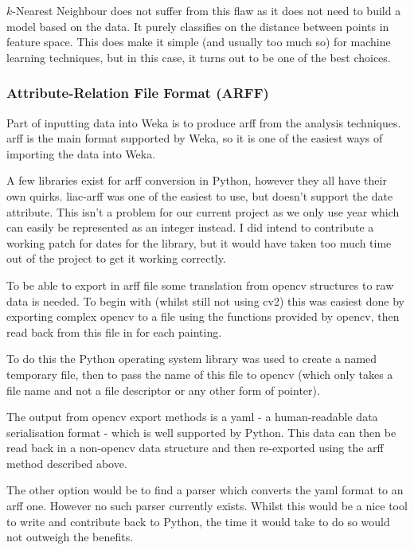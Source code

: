 $k$-Nearest Neighbour does not suffer from this flaw as it does not need to build a model based on
the data. It purely classifies on the distance between points in feature space. This does make it
simple (and usually too much so) for machine learning techniques, but in this case, it turns out to 
be one of the best choices.


\subsubsection{Attribute-Relation File Format (ARFF)}
Part of inputting data into Weka is to produce \gls{arff} from the
analysis techniques. \gls{arff} is the main format supported by Weka, so it is one of the easiest ways
of importing the data into Weka.

A few libraries exist for \gls{arff} conversion in Python, however they all have their own quirks. 
liac-arff was one of the easiest to use, but doesn't support the date attribute. This isn't
a problem for our current project as we only use year which can easily be represented as an 
integer instead. I did intend to contribute a working patch for dates for the library, but it 
would have taken too much time out of the project to get it working correctly.

To be able to export in \gls{arff} file some translation from \gls{opencv} structures to raw data is 
needed. To begin with (whilst still not using \gls{cv2}) this was easiest done by exporting 
complex \gls{opencv} to a file using the functions provided by \gls{opencv}, then read back from
this file in for each painting.

To do this the Python operating system library was used to create a named temporary file, then to
pass the name of this file to \gls{opencv} (which only takes a file name and not a file descriptor
or any other form of pointer). 

The output from \gls{opencv} export methods is a \gls{yaml} - a human-readable data serialisation
format - which is well supported by Python. This data can then be read back in a non-\gls{opencv}
data structure and then re-exported using the \gls{arff} method described above.

The other option would be to find a parser which converts the \gls{yaml} format to an \gls{arff} 
one. However no such parser currently exists. Whilst this would be a nice tool to write and
contribute back to Python, the time it would take to do so would not outweigh the benefits.


